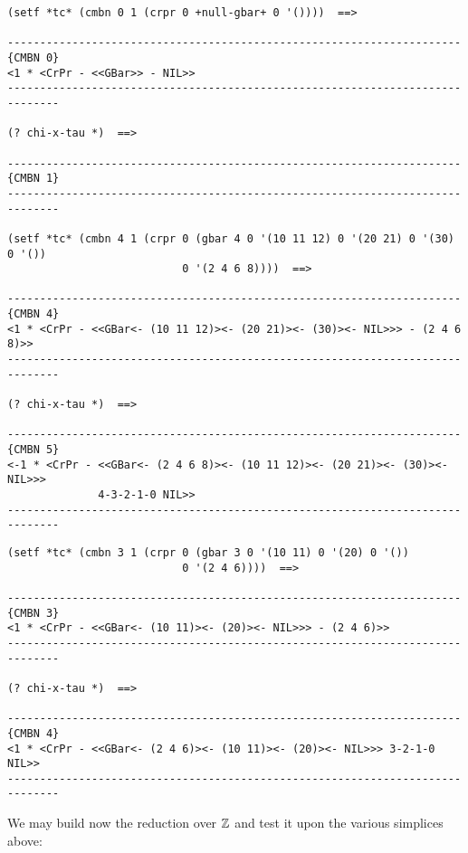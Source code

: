 {\footnotesize\begin{verbatim}
(setf *tc* (cmbn 0 1 (crpr 0 +null-gbar+ 0 '())))  ==>

----------------------------------------------------------------------{CMBN 0}
<1 * <CrPr - <<GBar>> - NIL>>
------------------------------------------------------------------------------

(? chi-x-tau *)  ==>

----------------------------------------------------------------------{CMBN 1}
------------------------------------------------------------------------------

(setf *tc* (cmbn 4 1 (crpr 0 (gbar 4 0 '(10 11 12) 0 '(20 21) 0 '(30) 0 '())
                           0 '(2 4 6 8))))  ==>

----------------------------------------------------------------------{CMBN 4}
<1 * <CrPr - <<GBar<- (10 11 12)><- (20 21)><- (30)><- NIL>>> - (2 4 6 8)>>
------------------------------------------------------------------------------

(? chi-x-tau *)  ==>

----------------------------------------------------------------------{CMBN 5}
<-1 * <CrPr - <<GBar<- (2 4 6 8)><- (10 11 12)><- (20 21)><- (30)><- NIL>>>
              4-3-2-1-0 NIL>>
------------------------------------------------------------------------------
\end{verbatim}}
\newpage
{\footnotesize\begin{verbatim}
(setf *tc* (cmbn 3 1 (crpr 0 (gbar 3 0 '(10 11) 0 '(20) 0 '())
                           0 '(2 4 6))))  ==>

----------------------------------------------------------------------{CMBN 3}
<1 * <CrPr - <<GBar<- (10 11)><- (20)><- NIL>>> - (2 4 6)>>
------------------------------------------------------------------------------

(? chi-x-tau *)  ==>

----------------------------------------------------------------------{CMBN 4}
<1 * <CrPr - <<GBar<- (2 4 6)><- (10 11)><- (20)><- NIL>>> 3-2-1-0 NIL>>
------------------------------------------------------------------------------
\end{verbatim}}
We may build now the reduction over ${\mathbb{Z}}$ and test it upon the various simplices
above:
